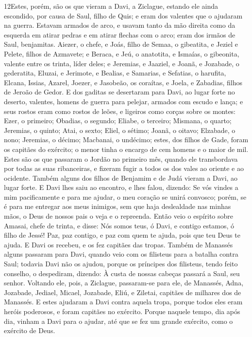 \lettrine{12} Estes, porém, são os que vieram a Davi, a
Ziclague, estando ele ainda escondido, por causa de Saul, filho de
Quis; e eram dos valentes que o ajudaram na guerra. Estavam
armados de arco, e usavam tanto da mão direita como da esquerda em
atirar pedras e em atirar flechas com o arco; eram dos irmãos de
Saul, benjamitas. Aiezer, o chefe, e Joás, filho de Semaa, o
gibeatita, e Jeziel e Pelete, filhos de Azmavete; e Beraca, e Jeú, o
anatotita, e Ismaías, o gibeonita, valente entre os trinta,
líder deles; e Jeremias, e Jaaziel, e Joanã, e Jozabade, o
gederatita, Eluzai, e Jerimote, e Bealias, e Samarias, e
Sefatias, o harufita, Elcana, Issias, Azarel, Joezer, e
Jasobeão, os coraítas, e Joela, e Zabadias, filhos de Jeroão de
Gedor. E dos gaditas se desertaram para Davi, ao lugar forte no
deserto, valentes, homens de guerra para pelejar, armados com escudo
e lança; e seus rostos eram como rostos de leões, e ligeiros como
corças sobre os montes: Ezer, o primeiro; Obadias, o segundo;
Eliabe, o terceiro; Mismana, o quarto; Jeremias, o quinto;
Atai, o sexto; Eliel, o sétimo; Joanã, o oitavo;
Elzabade, o nono; Jeremias, o décimo; Macbanai, o undécimo;
estes, dos filhos de Gade, foram os capitães do exército; o
menor tinha o encargo de cem homens e o maior de mil. Estes
são os que passaram o Jordão no primeiro mês, quando ele
transbordava por todas as suas ribanceiras, e fizeram fugir a todos
os dos vales ao oriente e ao ocidente. Também alguns dos
filhos de Benjamim e de Judá vieram a Davi, ao lugar forte. E
Davi lhes saiu ao encontro, e lhes falou, dizendo: Se vós vindes a
mim pacificamente e para me ajudar, o meu coração se unirá convosco;
porém, se é para me entregar aos meus inimigos, sem que haja
deslealdade nas minhas mãos, o Deus de nossos pais o veja e o
repreenda. Então veio o espírito sobre Amasai, chefe de
trinta, e disse: Nós somos teus, ó Davi, e contigo estamos, ó filho
de Jessé! Paz, paz contigo, e paz com quem te ajuda, pois que teu
Deus te ajuda. E Davi os recebeu, e os fez capitães das tropas.
Também de Manassés alguns passaram para Davi, quando veio com
os filisteus para a batalha contra Saul; todavia Davi não os ajudou,
porque os príncipes dos filisteus, tendo feito conselho, o
despediram, dizendo: À custa de nossas cabeças passará a Saul, seu
senhor. Voltando ele, pois, a Ziclague, passaram-se para ele,
de Manassés, Adna, Jozabade, Jediael, Micael, Jozabade, Eliú, e
Ziletai, capitães de milhares dos de Manassés. E estes
ajudaram a Davi contra aquela tropa, porque todos eles eram heróis
poderosos, e foram capitães no exército. Porque naquele
tempo, dia após dia, vinham a Davi para o ajudar, até que se fez um
grande exército, como o exército de Deus.

